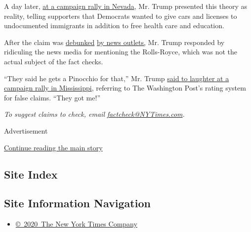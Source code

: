 A day later,
\href{https://www.c-span.org/video/?453249-1/president-trump-campaigns-nevada-republican-senator-dean-heller}{at
a campaign rally in Nevada}, Mr. Trump presented this theory as reality,
telling supporters that Democrats wanted to give cars and licenses to
undocumented immigrants in addition to free health care and education.

After the claim was
\href{https://www.snopes.com/fact-check/democrats-free-cars-immigrants/}{debunked}
\href{https://www.politifact.com/truth-o-meter/statements/2018/oct/22/donald-trump/donald-trump-says-democrats-want-give-cars-undocum/}{by
news outlets,} Mr. Trump responded by ridiculing the news media for
mentioning the Rolls-Royce, which was not the actual subject of the fact
checks.

``They said he gets a Pinocchio for that,'' Mr. Trump
\href{https://www.youtube.com/watch?time_continue=1318\&v=0ri5QQVhJhg}{said
to laughter at a campaign rally in Mississippi}, referring to The
Washington Post's rating system for false claims. ``They got me!''

\emph{To suggest claims to check, email}
\href{mailto:factcheck@NYTimes.com}{\emph{factcheck@NYTimes.com}}\emph{.}

Advertisement

\protect\hyperlink{after-bottom}{Continue reading the main story}

\hypertarget{site-index}{%
\subsection{Site Index}\label{site-index}}

\hypertarget{site-information-navigation}{%
\subsection{Site Information
Navigation}\label{site-information-navigation}}

\begin{itemize}
\tightlist
\item
  \href{https://help.nytimes3xbfgragh.onion/hc/en-us/articles/115014792127-Copyright-notice}{©~2020~The
  New York Times Company}
\end{itemize}

